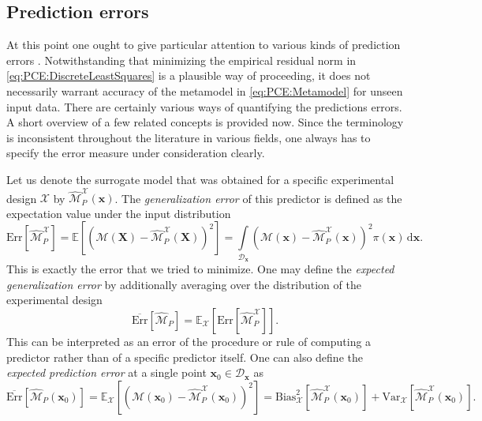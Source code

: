 \subsection{Prediction errors}
At this point one ought to give particular attention to various kinds of prediction errors \cite{Statistics:Breiman1992,Statistics:Borra2010}.
Notwithstanding that minimizing the empirical residual norm in \cref{eq:PCE:DiscreteLeastSquares} is a plausible way of proceeding,
it does not necessarily warrant accuracy of the metamodel in \cref{eq:PCE:Metamodel} for unseen input data.
There are certainly various ways of quantifying the predictions errors.
A short overview of a few related concepts is provided now.
Since the terminology is inconsistent throughout the literature in various fields, one always has to specify the error measure under consideration clearly.
\par %
Let us denote the surrogate model that was obtained for a specific experimental design \(\mathcal{X}\) by  \(\hat{\mathcal{M}}_P^{\mathcal{X}}(\bm{x})\).
The \emph{generalization error} of this predictor is defined as the expectation value under the input distribution
\begin{equation} \label{eq:PCE:GeneralizationError}
  \mathrm{Err} \left[ \hat{\mathcal{M}}_P^{\mathcal{X}} \right]
  = \mathds{E} \left[ \left( \mathcal{M}(\bm{X}) - \hat{\mathcal{M}}_P^{\mathcal{X}}(\bm{X}) \right)^2 \right]
  = \int\limits_{\mathcal{D}_{\bm{x}}} \left( \mathcal{M}(\bm{x}) - \hat{\mathcal{M}}_P^{\mathcal{X}}(\bm{x}) \right)^2 \pi(\bm{x}) \, \mathrm{d} \bm{x}.
\end{equation}
This is exactly the error that we tried to minimize.
One may define the \emph{expected generalization error} by additionally averaging over the distribution of the experimental design
\begin{equation} \label{eq:PCE:AverageGeneralizationError}
  \overline{\mathrm{Err}} \left[ \hat{\mathcal{M}}_P \right] = \mathds{E}_{\mathcal{X}} \left[ \mathrm{Err} \left[ \hat{\mathcal{M}}_P^{\mathcal{X}} \right] \right].
\end{equation}
This can be interpreted as an error of the procedure or rule of computing a predictor rather than of a specific predictor itself.
One can also define the \emph{expected prediction error} at a single point \(\bm{x}_0 \in \mathcal{D}_{\bm{x}}\) as
\begin{equation} \label{eq:PCE:ExpectedPredictionError}
  \overline{\mathrm{Err}} \left[ \hat{\mathcal{M}}_P(\bm{x}_0) \right]
  = \mathds{E}_{\mathcal{X}} \left[ \left( \mathcal{M}(\bm{x}_0) - \hat{\mathcal{M}}_P^{\mathcal{X}}(\bm{x}_0) \right)^2 \right]
  = \text{Bias}_{\mathcal{X}}^2 \left[ \hat{\mathcal{M}}_P^{\mathcal{X}}(\bm{x}_0) \right] + \text{Var}_{\mathcal{X}} \left[ \hat{\mathcal{M}}_P^{\mathcal{X}}(\bm{x}_0) \right].
\end{equation}
